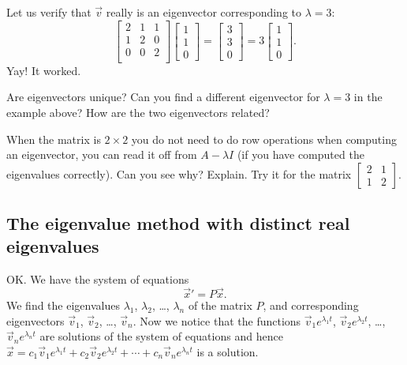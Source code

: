 \begin{example}
Let us verify that $\vec{v}$ really is an eigenvector corresponding to $\lambda = 3$:
\begin{equation*}
\begin{bmatrix}
2 & 1 & 1 \\
1 & 2 & 0 \\
0 & 0 & 2 \\
\end{bmatrix}
\begin{bmatrix}
1 \\
1 \\
0
\end{bmatrix}
=
\begin{bmatrix}
3 \\
3 \\
0
\end{bmatrix}
=
3
\begin{bmatrix}
1 \\
1 \\
0
\end{bmatrix} .
\end{equation*}
Yay!  It worked.
\end{example}

\begin{exercise}[easy]
Are eigenvectors unique?  Can you find a different eigenvector for
$\lambda = 3$ in the example above?  How are the two eigenvectors related?
\end{exercise}

\begin{exercise}
When the matrix is $2 \times 2$ you do not need to
do row operations when computing an eigenvector,
you can read it off from $A-\lambda I$
(if you have computed the eigenvalues correctly).
Can you see why?  Explain.  Try it for the matrix
$\left[ \begin{smallmatrix} 2 & 1 \\ 1 & 2 \end{smallmatrix} \right]$.
\end{exercise}

\subsection{The eigenvalue method with distinct real eigenvalues}

OK\@.  We have the system of equations
\begin{equation*}
{\vec{x}}' = P\vec{x} .
\end{equation*}
We find the eigenvalues $\lambda_1$, $\lambda_2$, \ldots, $\lambda_n$
of the matrix $P$, and corresponding eigenvectors
$\vec{v}_1$, $\vec{v}_2$, \ldots, $\vec{v}_n$.
Now we notice that the functions
$\vec{v}_1 e^{\lambda_1 t}$, 
$\vec{v}_2 e^{\lambda_2 t}$, \ldots,
$\vec{v}_n e^{\lambda_n t}$ are solutions of the system of equations and hence
$
\vec{x} = c_1 \vec{v}_1 e^{\lambda_1 t} +
c_2 \vec{v}_2 e^{\lambda_2 t} + \cdots +
c_n \vec{v}_n e^{\lambda_n t}
$
is a solution.

